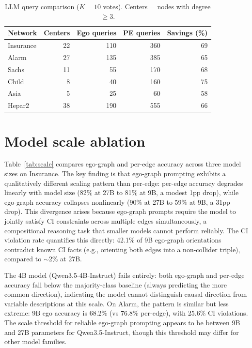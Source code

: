 \documentclass{article} %
\begin{document}
\begin{table}[h]
\centering
\caption{LLM query comparison ($K{=}10$ votes). Centers = nodes with degree $\geq 3$.}
\small
\begin{tabular}{lrrrr}
\toprule
Network & Centers & Ego queries & PE queries & Savings (\%) \\
\midrule
Insurance & 22 & 110 & 360 & 69 \\
Alarm     & 27 & 135 & 385 & 65 \\
Sachs     & 11 & 55  & 170 & 68 \\
Child     & 8  & 40  & 160 & 75 \\
Asia      & 5  & 25  & 60  & 58 \\
Hepar2    & 38 & 190 & 555 & 66 \\
\bottomrule
\end{tabular}
\end{table}

\section{Model scale ablation}
\label{app:scale}

Table~\ref{tab:scale} compares ego-graph and per-edge accuracy across three model sizes on Insurance. The key finding is that ego-graph prompting exhibits a qualitatively different scaling pattern than per-edge: per-edge accuracy degrades linearly with model size (82\% at 27B to 81\% at 9B, a modest 1pp drop), while ego-graph accuracy collapses nonlinearly (90\% at 27B to 59\% at 9B, a 31pp drop). This divergence arises because ego-graph prompts require the model to jointly satisfy CI constraints across multiple edges simultaneously, a compositional reasoning task that smaller models cannot perform reliably. The CI violation rate quantifies this directly: 42.1\% of 9B ego-graph orientations contradict known CI facts (e.g., orienting both edges into a non-collider triple), compared to $\sim$2\% at 27B.

The 4B model (Qwen3.5-4B-Instruct) fails entirely: both ego-graph and per-edge accuracy fall below the majority-class baseline (always predicting the more common direction), indicating the model cannot distinguish causal direction from variable descriptions at this scale. On Alarm, the pattern is similar but less extreme: 9B ego accuracy is 68.2\% (vs 76.8\% per-edge), with 25.6\% CI violations. The scale threshold for reliable ego-graph prompting appears to be between 9B and 27B parameters for Qwen3.5-Instruct, though this threshold may differ for other model families.
\end{document}
